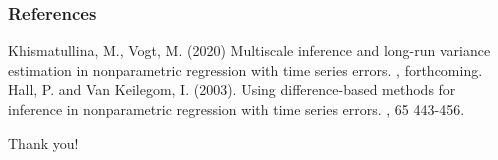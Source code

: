 \documentclass[10pt]{beamer}
\begin{document}
\begin{frame}%
  \frametitle<presentation>{References}    
  \begin{thebibliography}{10}    
  \beamertemplatearticlebibitems
    Khismatullina, M., Vogt, M. (2020)
    \newblock Multiscale inference and long-run variance estimation in nonparametric regression with time series errors.
    , forthcoming.
  Hall, P. and Van Keilegom, I. (2003).
  \newblock Using difference-based methods for inference in nonparametric regression with time series errors.
    , 65 443-456.
  \end{thebibliography}
\end{frame}

\begin{frame}[standout]
  Thank you!
\end{frame}




\appendix
\end{document}
